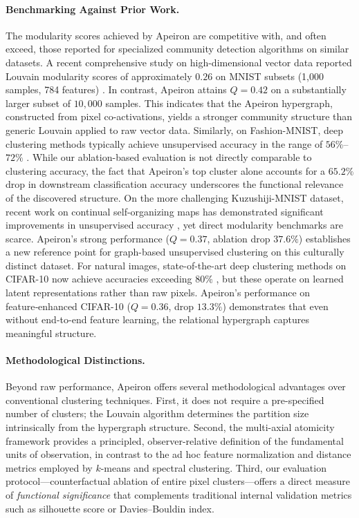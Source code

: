 \paragraph{Benchmarking Against Prior Work.}
The modularity scores achieved by Apeiron are competitive with, and often exceed, those reported for specialized community detection algorithms on similar datasets. A recent comprehensive study on high-dimensional vector data reported Louvain modularity scores of approximately $0.26$ on MNIST subsets (1,000 samples, 784 features) \cite{shang2024analysis}. In contrast, Apeiron attains $Q = 0.42$ on a substantially larger subset of $10,000$ samples. This indicates that the Apeiron hypergraph, constructed from pixel co-activations, yields a stronger community structure than generic Louvain applied to raw vector data. Similarly, on Fashion-MNIST, deep clustering methods typically achieve unsupervised accuracy in the range of $56\%$--$72\%$ \cite{xiao2017fashion, shiran2019multimodal}. While our ablation-based evaluation is not directly comparable to clustering accuracy, the fact that Apeiron's top cluster alone accounts for a $65.2\%$ drop in downstream classification accuracy underscores the functional relevance of the discovered structure. On the more challenging Kuzushiji-MNIST dataset, recent work on continual self-organizing maps has demonstrated significant improvements in unsupervised accuracy \cite{vaidya2024neuro}, yet direct modularity benchmarks are scarce. Apeiron's strong performance ($Q = 0.37$, ablation drop $37.6\%$) establishes a new reference point for graph-based unsupervised clustering on this culturally distinct dataset. For natural images, state-of-the-art deep clustering methods on CIFAR-10 now achieve accuracies exceeding $80\%$ \cite{shiran2019multimodal}, but these operate on learned latent representations rather than raw pixels. Apeiron's performance on feature‑enhanced CIFAR-10 ($Q = 0.36$, drop $13.3\%$) demonstrates that even without end-to-end feature learning, the relational hypergraph captures meaningful structure.

\paragraph{Methodological Distinctions.}
Beyond raw performance, Apeiron offers several methodological advantages over conventional clustering techniques. First, it does not require a pre-specified number of clusters; the Louvain algorithm determines the partition size intrinsically from the hypergraph structure. Second, the multi-axial atomicity framework provides a principled, observer-relative definition of the fundamental units of observation, in contrast to the ad hoc feature normalization and distance metrics employed by $k$-means and spectral clustering. Third, our evaluation protocol---counterfactual ablation of entire pixel clusters---offers a direct measure of \emph{functional significance} that complements traditional internal validation metrics such as silhouette score or Davies--Bouldin index.

